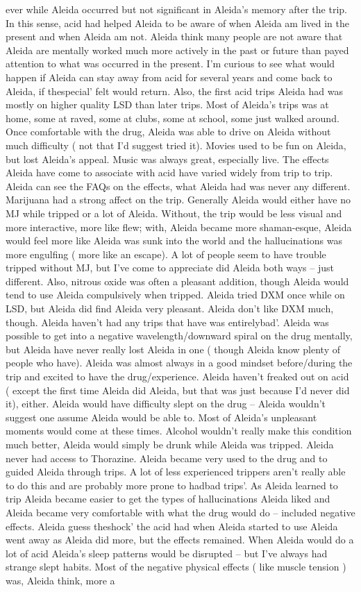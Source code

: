 \documentclass[12pt]{book}
\begin{document}
ever while Aleida occurred but not significant in Aleida's memory after the trip. In this sense, acid had helped Aleida to be aware of when Aleida am lived in the present and when Aleida am not. Aleida think many people are not aware that Aleida are mentally worked much more actively in the past or future than payed attention to what was occurred in the present. I'm curious to see what would happen if Aleida can stay away from acid for several years and come back to Aleida, if thespecial' felt would return. Also, the first acid trips Aleida had was mostly on higher quality LSD than later trips. Most of Aleida's trips was at home, some at raved, some at clubs, some at school, some just walked around. Once comfortable with the drug, Aleida was able to drive on Aleida without much difficulty ( not that I'd suggest tried it). Movies used to be fun on Aleida, but lost Aleida's appeal. Music was always great, especially live. The effects Aleida have come to associate with acid have varied widely from trip to trip. Aleida can see the FAQs on the effects, what Aleida had was never any different. Marijuana had a strong affect on the trip. Generally Aleida would either have no MJ while tripped or a lot of Aleida. Without, the trip would be less visual and more interactive, more like flew; with, Aleida became more shaman-esque, Aleida would feel more like Aleida was sunk into the world and the hallucinations was more engulfing ( more like an escape). A lot of people seem to have trouble tripped without MJ, but I've come to appreciate did Aleida both ways -- just different. Also, nitrous oxide was often a pleasant addition, though Aleida would tend to use Aleida compulsively when tripped. Aleida tried DXM once while on LSD, but Aleida did find Aleida very pleasant. Aleida don't like DXM much, though. Aleida haven't had any trips that have was entirelybad'. Aleida was possible to get into a negative wavelength/downward spiral on the drug mentally, but Aleida have never really lost Aleida in one ( though Aleida know plenty of people who have). Aleida was almost always in a good mindset before/during the trip and excited to have the drug/experience. Aleida haven't freaked out on acid ( except the first time Aleida did Aleida, but that was just because I'd never did it), either. Aleida would have difficulty slept on the drug -- Aleida wouldn't suggest one assume Aleida would be able to. Most of Aleida's unpleasant moments would come at these times. Alcohol wouldn't really make this condition much better, Aleida would simply be drunk while Aleida was tripped. Aleida never had access to Thorazine. Aleida became very used to the drug and to guided Aleida through trips. A lot of less experienced trippers aren't really able to do this and are probably more prone to hadbad trips'. As Aleida learned to trip Aleida became easier to get the types of hallucinations Aleida liked and Aleida became very comfortable with what the drug would do -- included negative effects. Aleida guess theshock' the acid had when Aleida started to use Aleida went away as Aleida did more, but the effects remained. When Aleida would do a lot of acid Aleida's sleep patterns would be disrupted -- but I've always had strange slept habits. Most of the negative physical effects ( like muscle tension ) was, Aleida think, more a 
\end{document}
